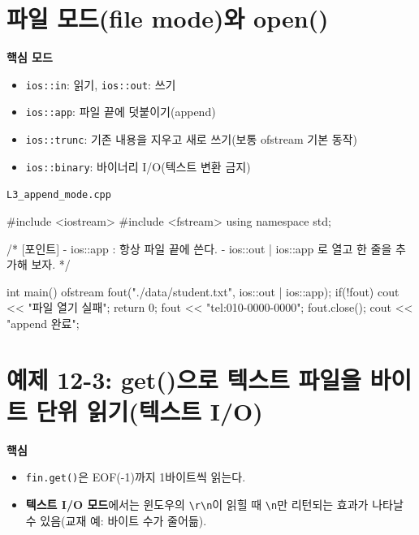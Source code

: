 \documentclass[11pt,a4paper]{article}
\newcommand{\filetag}[1]{\texttt{\color{Accent}#1}}
\begin{document}
\section{파일 모드(file mode)와 open()}
\begin{GoalBox}
\textbf{핵심 모드}
\begin{itemize}[leftmargin=18pt]
  \item \texttt{ios::in}: 읽기, \texttt{ios::out}: 쓰기
  \item \texttt{ios::app}: 파일 끝에 덧붙이기(append) %
  \item \texttt{ios::trunc}: 기존 내용을 지우고 새로 쓰기(보통 ofstream 기본 동작) %
  \item \texttt{ios::binary}: 바이너리 I/O(텍스트 변환 금지) %
\end{itemize}
\end{GoalBox}

\noindent\filetag{L3\_append\_mode.cpp}
\begin{cppcode}
#include <iostream>
#include <fstream>
using namespace std;

/*
[포인트]
- ios::app : 항상 파일 끝에 쓴다.
- ios::out | ios::app 로 열고 한 줄을 추가해 보자.
*/

int main() {
    ofstream fout("./data/student.txt", ios::out | ios::app);
    if(!fout) {
        cout << "파일 열기 실패\n";
        return 0;
    }
    fout << "tel:010-0000-0000\n";
    fout.close();
    cout << "append 완료\n";
}
\end{cppcode}

\section{예제 12-3: get()으로 텍스트 파일을 바이트 단위 읽기(텍스트 I/O)}
\begin{GoalBox}
\textbf{핵심}
\begin{itemize}[leftmargin=18pt]
  \item \texttt{fin.get()}은 EOF(-1)까지 1바이트씩 읽는다. %
  \item \textbf{텍스트 I/O 모드}에서는 윈도우의 \texttt{\textbackslash r\textbackslash n}이 읽힐 때 \texttt{\textbackslash n}만 리턴되는 효과가 나타날 수 있음(교재 예: 바이트 수가 줄어듦). %
\end{itemize}
\end{GoalBox}
\end{document}
